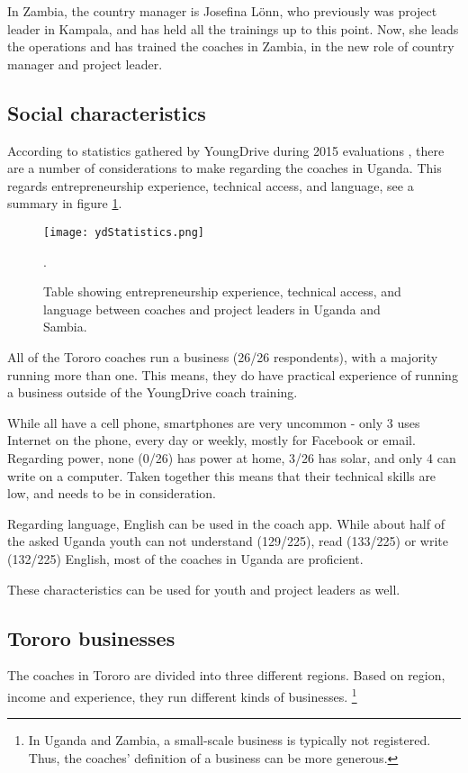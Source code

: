 In Zambia, the country manager is Josefina Lönn, who previously was project leader in Kampala, and has held all the trainings up to this point. Now, she leads the operations and has trained the coaches in Zambia, in the new role of country manager and project leader.

\subsection{Social characteristics}

According to statistics gathered by YoungDrive during 2015 evaluations \cite{youngdrive-statistics}, there are a number of considerations to make regarding the coaches in Uganda. This regards entrepreneurship experience, technical access, and language, see a summary in figure \ref{fig:ydStatistics}.

\begin{figure}[h]
    \centering
    \texttt{[image: ydStatistics.png]}
    \caption{Table showing entrepreneurship experience, technical access, and language between coaches and project leaders in Uganda and Sambia.}.
    \label{fig:ydStatistics}
\end{figure}

All of the Tororo coaches run a business (26/26 respondents), with a majority running more than one. This means, they do have practical experience of running a business outside of the YoungDrive coach training.

While all have a cell phone, smartphones are very uncommon - only 3 uses Internet on the phone, every day or weekly, mostly for Facebook or email. Regarding power, none (0/26) has power at home, 3/26 has solar, and only 4 can write on a computer. Taken together this means that their technical skills are low, and needs to be in consideration.

Regarding language, English can be used in the coach app. While about half of the asked Uganda youth can not understand (129/225), read (133/225) or write (132/225) English, most of the coaches in Uganda are proficient.

These characteristics can be used for youth and project leaders as well.

\subsection{Tororo businesses}

The coaches in Tororo are divided into three different regions. Based on region, income and experience, they run different kinds of businesses. \footnote{In Uganda and Zambia, a small-scale business is typically not registered. Thus, the coaches' definition of a business can be more generous.}

